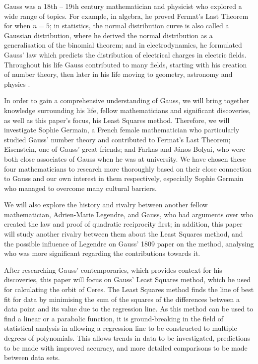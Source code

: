 \documentclass{article}
\begin{document}
Gauss was a 18th – 19th century mathematician and physicist who explored a wide range of topics. For example, in algebra, he proved Fermat's Last Theorem for when \(n=5\); in statistics, the normal distribution curve is also called a Gaussian distribution, where he derived the normal distribution as a generalisation of the binomial theorem; and in electrodynamics, he formulated Gauss' law which predicts the distribution of electrical charges in electric fields. Throughout his life Gauss contributed to many fields, starting with his creation of number theory, then later in his life moving to geometry, astronomy and physics \cite{princeofmathematics}.

In order to gain a comprehensive understanding of Gauss, we will bring together knowledge surrounding his life, fellow mathematicians and significant discoveries, as well as this paper’s focus, his Least Squares method. Therefore, we will investigate Sophie Germain, a French female mathematician who particularly studied Gauss' number theory and contributed to Fermat's Last Theorem; Eisenstein, one of Gauss' great friends; and Farkas and János Bolyai, who were both close associates of Gauss when he was at university. We have chosen these four mathematicians to research more thoroughly based on their close connection to Gauss and our own interest in them respectively, especially Sophie Germain who managed to overcome many cultural barriers.

We will also explore the history and rivalry between another fellow mathematician, Adrien-Marie Legendre, and Gauss, who had arguments over who created the law and proof of quadratic reciprocity first; in addition, this paper will study another rivalry between them about the Least Squares method, and the possible influence of Legendre on Gauss’ 1809 paper on the method, analysing who was more significant regarding the contributions towards it.  

After researching Gauss’ contemporaries, which provides context for his discoveries, this paper will focus on Gauss' Least Squares method, which he used for calculating the orbit of Ceres. The Least Squares method finds the line of best fit for data by minimising the sum of the squares of the differences between a data point and its value due to the regression line. As this method can be used to find a linear or a parabolic function, it is ground-breaking in the field of statistical analysis in allowing a regression line to be constructed to multiple degrees of polynomials. This allows trends in data to be investigated, predictions to be made with improved accuracy, and more detailed comparisons to be made between data sets. 
\end{document}
